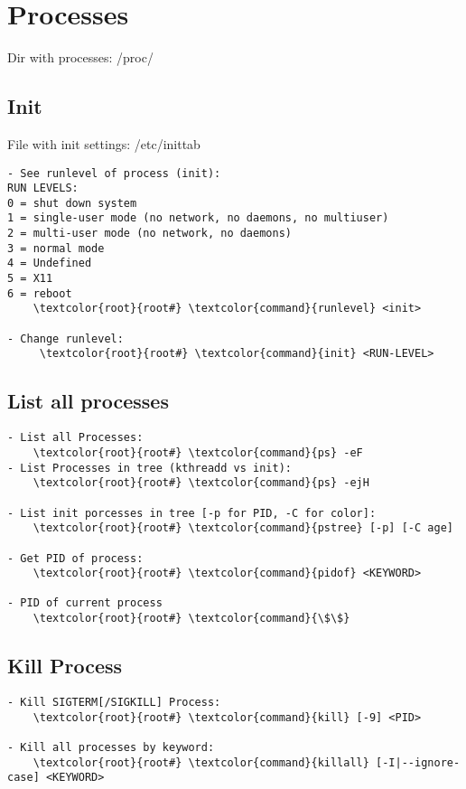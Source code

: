 \documentclass[10pt, a4paper, onecolumn, openany]{book}         %
\begin{document}
\section{Processes}
Dir with processes: \textcolor{dir}{/proc/}

\subsection{Init}
File with init settings: \textcolor{file}{/etc/inittab}
\begin{Verbatim}[commandchars=\\\{\}]
- See runlevel of process (init):
RUN LEVELS:
0 = shut down system
1 = single-user mode (no network, no daemons, no multiuser)
2 = multi-user mode (no network, no daemons)
3 = normal mode
4 = Undefined
5 = X11
6 = reboot
    \textcolor{root}{root#} \textcolor{command}{runlevel} <init>

- Change runlevel:
     \textcolor{root}{root#} \textcolor{command}{init} <RUN-LEVEL>
\end{Verbatim}


\subsection{List all processes}
\begin{Verbatim}[commandchars=\\\{\}]
- List all Processes:
    \textcolor{root}{root#} \textcolor{command}{ps} -eF
- List Processes in tree (kthreadd vs init):
    \textcolor{root}{root#} \textcolor{command}{ps} -ejH

- List init porcesses in tree [-p for PID, -C for color]:
    \textcolor{root}{root#} \textcolor{command}{pstree} [-p] [-C age]
    
- Get PID of process:
    \textcolor{root}{root#} \textcolor{command}{pidof} <KEYWORD>
    
- PID of current process
    \textcolor{root}{root#} \textcolor{command}{\$\$}
\end{Verbatim}

\subsection{Kill Process}
\begin{Verbatim}[commandchars=\\\{\}]
- Kill SIGTERM[/SIGKILL] Process:
    \textcolor{root}{root#} \textcolor{command}{kill} [-9] <PID>

- Kill all processes by keyword:
    \textcolor{root}{root#} \textcolor{command}{killall} [-I|--ignore-case] <KEYWORD>
\end{Verbatim}
\end{document}
